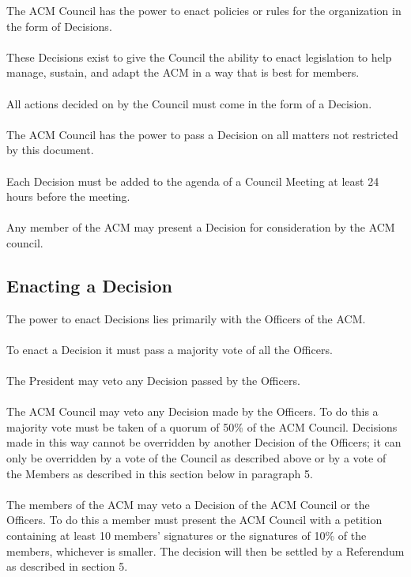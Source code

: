 \documentclass[12pt,titlepage]{article}
\begin{document}
The ACM Council has the power to enact policies or rules for the organization in the form of Decisions.\\
\\
These Decisions exist to give the Council the ability to enact legislation to help manage, sustain, and adapt the ACM in a way that is best for members.\\
\\
All actions decided on by the Council must come in the form of a Decision.\\
\\
The ACM Council has the power to pass a Decision on all matters not restricted by this document.\\
\\
Each Decision must be added to the agenda of a Council Meeting at least 24 hours before the meeting.\\
\\
Any member of the ACM may present a Decision for consideration by the ACM council.

\subsection{Enacting a Decision}

The power to enact Decisions lies primarily with the Officers of the ACM.\\
\\
To enact a Decision it must pass a majority vote of all the Officers.\\
\\
The President may veto any Decision passed by the Officers.\\
\\
The ACM Council may veto any Decision made by the Officers. To do this a majority vote must be taken of a quorum of 50\% of the ACM Council. Decisions made in this way cannot be overridden by another Decision of the Officers; it can only be overridden by a vote of the Council as described above or by a vote of the Members as described in this section below in paragraph 5.\\
\\
The members of the ACM may veto a Decision of the ACM Council or the Officers. To do this a member must present the ACM Council with a petition containing at least 10 members' signatures or the signatures of 10\% of the members, whichever is smaller. The decision will then be settled by a Referendum as described in section 5.
\end{document}
